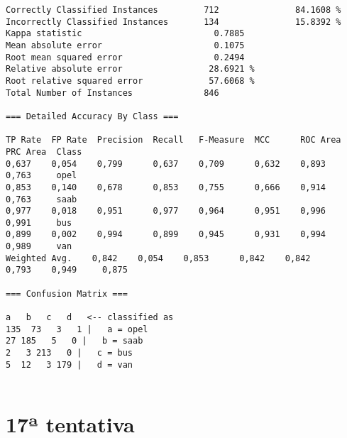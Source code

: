\documentclass[
	article,			%
	11pt,				%
	oneside,			%
	a4paper,			%
	english,			%
	brazil,				%
	sumario=tradicional
	]{abntex2}
\begin{document}
\begin{lstlisting}
Correctly Classified Instances         712               84.1608 %
Incorrectly Classified Instances       134               15.8392 %
Kappa statistic                          0.7885
Mean absolute error                      0.1075
Root mean squared error                  0.2494
Relative absolute error                 28.6921 %
Root relative squared error             57.6068 %
Total Number of Instances              846     

=== Detailed Accuracy By Class ===

TP Rate  FP Rate  Precision  Recall   F-Measure  MCC      ROC Area  PRC Area  Class
0,637    0,054    0,799      0,637    0,709      0,632    0,893     0,763     opel
0,853    0,140    0,678      0,853    0,755      0,666    0,914     0,763     saab
0,977    0,018    0,951      0,977    0,964      0,951    0,996     0,991     bus
0,899    0,002    0,994      0,899    0,945      0,931    0,994     0,989     van
Weighted Avg.    0,842    0,054    0,853      0,842    0,842      0,793    0,949     0,875     

=== Confusion Matrix ===

a   b   c   d   <-- classified as
135  73   3   1 |   a = opel
27 185   5   0 |   b = saab
2   3 213   0 |   c = bus
5  12   3 179 |   d = van


\end{lstlisting}

\newpage

\section{17ª tentativa}
\end{document}
